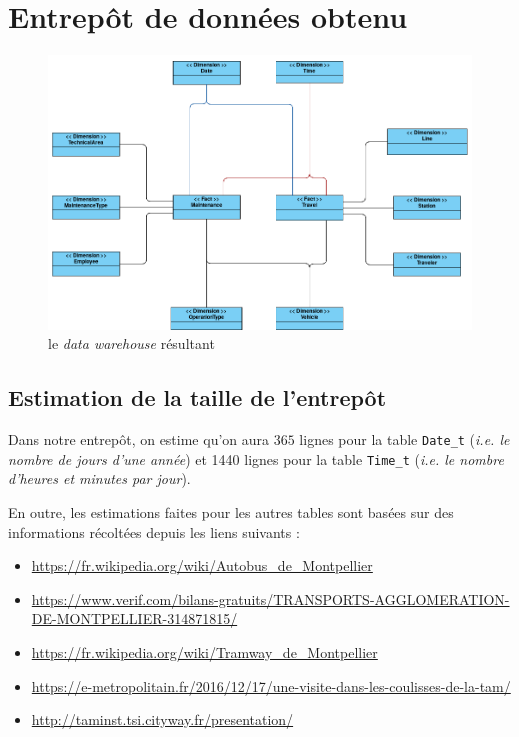 \documentclass[a4paper,12pt]{report}
\begin{document}
\section{Entrepôt de données obtenu}
\begin{figure}[!ht]
  \centering
  \includegraphics[scale=0.4]{images/data_warehouse.png}
  \caption{le \textit{data warehouse} résultant}
\end{figure}

\subsection{Estimation de la taille de l'entrepôt}
Dans notre entrepôt, on estime qu'on aura $365$ lignes pour la table \texttt{Date\_t} (\textit{i.e. le nombre de jours d'une année}) et 1440 lignes pour la table \texttt{Time\_t} (\textit{i.e. le nombre d'heures et minutes par jour}).

En outre, les estimations faites pour les autres tables sont basées sur des informations récoltées depuis les liens suivants :
\begin{itemize}
  \item \url{https://fr.wikipedia.org/wiki/Autobus_de_Montpellier}
  \item \url{https://www.verif.com/bilans-gratuits/TRANSPORTS-AGGLOMERATION-DE-MONTPELLIER-314871815/}
  \item \url{https://fr.wikipedia.org/wiki/Tramway_de_Montpellier}
  \item \url{https://e-metropolitain.fr/2016/12/17/une-visite-dans-les-coulisses-de-la-tam/}
  \item \url{http://taminst.tsi.cityway.fr/presentation/}
\end{itemize}
\end{document}
